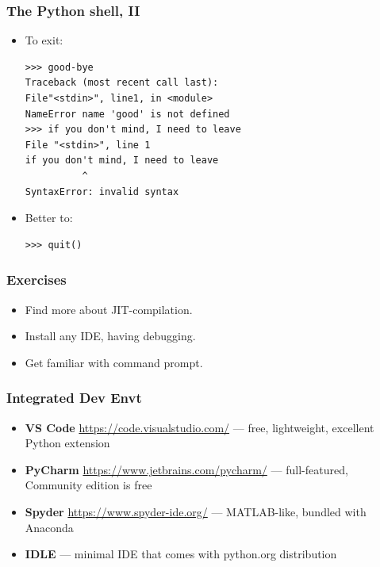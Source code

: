 \begin{frame}[fragile]\frametitle{The Python shell, II}
\begin{itemize}
\item To exit:
	\begin{lstlisting}
>>> good-bye
Traceback (most recent call last):
File"<stdin>", line1, in <module>
NameError name 'good' is not defined
>>> if you don't mind, I need to leave 
File "<stdin>", line 1
if you don't mind, I need to leave
          ^
SyntaxError: invalid syntax
	\end{lstlisting}

\item Better to: \\ 
\begin{lstlisting}
>>> quit()
\end{lstlisting}
\end{itemize}
\end{frame}

\begin{frame}[fragile]\frametitle{Exercises}
\begin{itemize}
\item Find more about JIT-compilation.
\item Install any IDE, having debugging.
\item Get familiar with command prompt.
\end{itemize}
\end{frame}

\begin{frame}[fragile]\frametitle{Integrated Dev Envt}
  \begin{itemize}
  \item \textbf{VS Code} \url{https://code.visualstudio.com/} --- free, lightweight, excellent Python extension
  \item \textbf{PyCharm} \url{https://www.jetbrains.com/pycharm/} --- full-featured, Community edition is free
  \item \textbf{Spyder} \url{https://www.spyder-ide.org/} --- MATLAB-like, bundled with Anaconda
  \item \textbf{IDLE} --- minimal IDE that comes with python.org distribution
  \end{itemize}
\end{frame}

